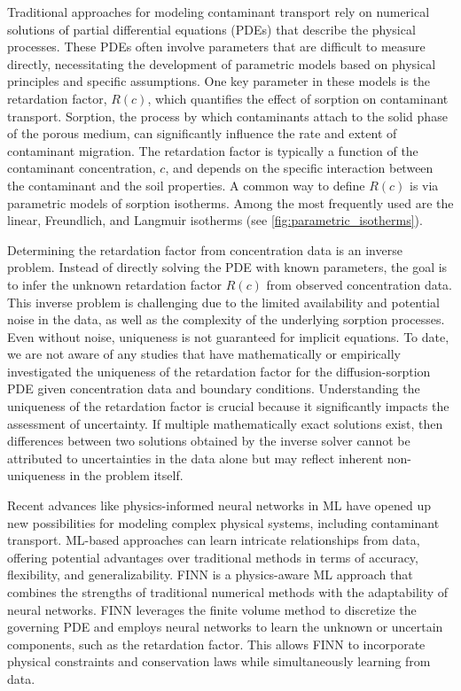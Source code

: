Traditional approaches for modeling contaminant transport rely on numerical solutions of partial differential equations (PDEs) that describe the physical processes. These PDEs often involve parameters that are difficult to measure directly, necessitating the development of parametric models based on physical principles and specific assumptions.
One key parameter in these models is the retardation factor, $R(c)$, which quantifies the effect of sorption on contaminant transport. Sorption, the process by which contaminants attach to the solid phase of the porous medium, can significantly influence the rate and extent of contaminant migration. The retardation factor is typically a function of the contaminant concentration, $c$, and depends on the specific interaction between the contaminant and the soil properties.
A common way to define $R(c)$ is via parametric models of sorption isotherms. Among the most frequently used are the linear, Freundlich, and Langmuir isotherms \cite{finn} (see \cref{fig:parametric_isotherms}).

Determining the retardation factor from concentration data is an inverse problem. Instead of directly solving the PDE with known parameters, the goal is to infer the unknown retardation factor $R(c)$ from observed concentration data. This inverse problem is challenging due to the limited availability and potential noise in the data, as well as the complexity of the underlying sorption processes. Even without noise, uniqueness is not guaranteed for implicit equations. To date, we are not aware of any studies that have mathematically or empirically investigated the uniqueness of the retardation factor for the diffusion-sorption PDE given concentration data and boundary conditions. Understanding the uniqueness of the retardation factor is crucial because it significantly impacts the assessment of uncertainty. If multiple mathematically exact solutions exist, then differences between two solutions obtained by the inverse solver cannot be attributed to uncertainties in the data alone but may reflect inherent non-uniqueness in the problem itself.

Recent advances like physics-informed neural networks in ML have opened up new possibilities for modeling complex physical systems, including contaminant transport. ML-based approaches can learn intricate relationships from data, offering potential advantages over traditional methods in terms of accuracy, flexibility, and generalizability. FINN \cite{finn} is a physics-aware ML approach that combines the strengths of traditional numerical methods with the adaptability of neural networks. FINN leverages the finite volume method to discretize the governing PDE and employs neural networks to learn the unknown or uncertain components, such as the retardation factor. This allows FINN to incorporate physical constraints and conservation laws while simultaneously learning from data.

